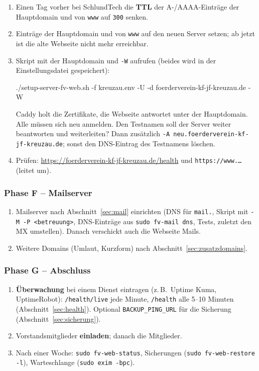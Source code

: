 \documentclass[a4paper,fontsize=10pt]{scrartcl}
\newcommand*{\cmd}[1]{\texttt{#1}}
\newcommand*{\erledigt}{\makebox[1.4em][l]{\setlength{\fboxsep}{0pt}\fbox{\rule{0pt}{0.7em}\hspace{0.7em}}}}
\begin{document}
\begin{enumerate}[resume]
  \item \erledigt Einen Tag vorher bei SchlundTech die \textbf{TTL} der A-/AAAA-Einträge
        der Hauptdomain und von \cmd{www} auf \cmd{300} senken.
  \item \erledigt Einträge der Hauptdomain und von \cmd{www} auf den neuen Server setzen;
        ab jetzt ist die alte Webseite nicht mehr erreichbar.
  \item \erledigt Skript mit der Hauptdomain und \cmd{-W} aufrufen (beides wird in der
        Einstellungsdatei gespeichert):
\begin{befehl}
./setup-server-fv-web.sh -f kreuzau.env -U -d foerderverein-kf-jf-kreuzau.de -W
\end{befehl}
        Caddy holt die Zertifikate, die Webseite antwortet unter der Hauptdomain. Alle
        müssen sich neu anmelden. Den Testnamen soll der Server weiter beantworten
        und weiterleiten? Dann zusätzlich \cmd{-A neu.foerderverein-kf-jf-kreuzau.de};
        sonst den DNS-Eintrag des Testnamens löschen.
  \item \erledigt Prüfen: \url{https://foerderverein-kf-jf-kreuzau.de/health} und
        \cmd{https://www.\dots} (leitet um).
\end{enumerate}

\subsubsection*{Phase F -- Mailserver}

\begin{enumerate}[resume]
  \item \erledigt Mailserver nach Abschnitt~\ref{sec:mail} einrichten (DNS für
        \cmd{mail.}, Skript mit \cmd{-M -P <betreuung>}, DNS-Einträge aus
        \cmd{sudo fv-mail dns}, Tests, zuletzt den MX umstellen). Danach verschickt
        auch die Webseite Mails.
  \item \erledigt Weitere Domains (Umlaut, Kurzform) nach
        Abschnitt~\ref{sec:zusatzdomains}.
\end{enumerate}

\subsubsection*{Phase G -- Abschluss}

\begin{enumerate}[resume]
  \item \erledigt\textbf{Überwachung} bei einem Dienst eintragen (z.\,B.\ Uptime Kuma,
        UptimeRobot): \cmd{/health/live} jede Minute, \cmd{/health} alle 5--10 Minuten
        (Abschnitt~\ref{sec:health}). Optional \cmd{BACKUP\_PING\_URL} für die
        Sicherung (Abschnitt~\ref{sec:sicherung}).
  \item \erledigt Vorstandsmitglieder \textbf{einladen}; danach die Mitglieder.
  \item \erledigt Nach einer Woche: \cmd{sudo fv-web-status}, Sicherungen
        (\cmd{sudo fv-web-restore -l}), Warteschlange (\cmd{sudo exim -bpc}).
\end{enumerate}
\end{document}
